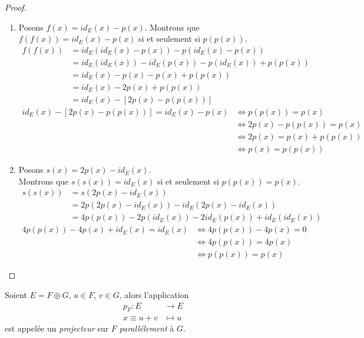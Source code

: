 \begin{proof}
    \begin{enumerate}
        \item Posons $f(x) = id_E(x) - p(x)$. Montrons que $f(f(x)) = id_E(x) - p(x)$ si et seulement si $p(p(x))$.
        \begin{align*}
            f(f(x)) &= id_E(id_E(x) - p(x)) - p(id_E(x) - p(x)) \\ 
            &= id_E(id_E(x)) - id_E(p(x)) - p(id_E(x)) + p(p(x)) \\ 
            &= id_E(x) - p(x) - p(x) + p(p(x)) \\ 
            &= id_E(x) - 2p(x) + p(p(x)) \\ 
            &= id_E(x) - [2p(x) - p(p(x))]
        \end{align*}
        \begin{align*}
            id_E(x) - [2p(x) - p(p(x))] = id_E(x) - p(x) &\iff p(p(x)) = p(x) \\ 
            &\iff 2p(x) - p(p(x)) = p(x) \\ 
            &\iff 2p(x) = p(x) + p(p(x)) \\
            &\iff p(x) = p(p(x))
        \end{align*}
        \item Posons $s(x) = 2p(x) - id_E(x)$. 
        \\
        Montrons que $s(s(x)) = id_E(x)$ si et seulement si $p(p(x)) = p(x)$.
        \begin{align*}
            s(s(x)) &= s(2p(x) - id_E(x)) \\
            &= 2p(2p(x) - id_E(x)) - id_E(2p(x) - id_E(x)) \\
            &= 4p(p(x)) - 2p(id_E(x)) - 2id_E(p(x)) + id_E(id_E(x))
        \end{align*}
        \begin{align*}
            4p(p(x)) - 4p(x) + id_E(x) = id_E(x) &\iff 4p(p(x)) - 4p(x) = 0 \\
            &\iff 4p(p(x)) = 4p(x) \\
            &\iff p(p(x)) = p(x)
        \end{align*}
    \end{enumerate}
\end{proof}

\begin{definition}
    Soient $E = F \oplus G$, $u \in F$, $v \in G$, alors l'application 
    \begin{align*}
        p_F : E &\to E \\
            x \equiv u + v &\mapsto u
    \end{align*}    
    est appelée un \emph{projecteur} sur $F$ \emph{parallélement} à $G$.
\end{definition}


